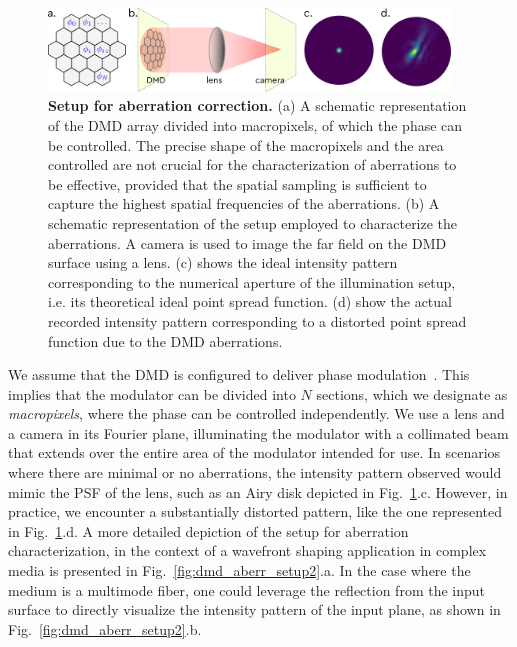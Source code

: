 \documentclass[12pt]{iopart}
\begin{document}
\begin{figure}
  \centering
  \includegraphics[width = 0.95\textwidth]{images/DMD_abberations_setup.pdf}
  \caption{
    \textbf{Setup for aberration correction.}
    (a) A schematic representation of the DMD array divided into macropixels,
    of which the phase can be controlled.
    The precise shape of the macropixels and the area controlled are not crucial for the characterization of aberrations to be effective,
    provided that the spatial sampling is sufficient to capture the highest spatial frequencies of the aberrations.
    (b) A schematic representation of the setup employed to characterize the aberrations.
    A camera is used to image the far field on the DMD surface using a lens.
    (c) shows the ideal intensity pattern corresponding to the numerical aperture of the illumination setup,
    i.e. its theoretical ideal point spread function.
    (d) show the actual recorded intensity pattern corresponding to a distorted point spread function due to the DMD aberrations.
  }
  \label{fig:dmd_aberr_setup}
\end{figure}


We assume that the DMD is configured to deliver phase modulation~\cite{lee1979binary,Gutierrez2024DMD}.
This implies that the modulator can be divided into $N$ sections,
which we designate as {\em macropixels},
where the phase can be controlled independently.
We use a lens and a camera in its Fourier plane,
illuminating the modulator with a collimated beam
that extends over the entire area of the modulator intended for use.
In scenarios where there are minimal or no aberrations,
the intensity pattern observed would mimic the PSF of the lens,
such as an Airy disk depicted in Fig.~\ref{fig:dmd_aberr_setup}.c.
However, in practice, we encounter a substantially distorted pattern,
like the one represented in Fig.~\ref{fig:dmd_aberr_setup}.d.
A more detailed depiction of the setup for aberration characterization,
in the context of a wavefront shaping application in complex media is presented in Fig.~\ref{fig:dmd_aberr_setup2}.a.
In the case where the medium is a multimode fiber,
one could leverage the reflection from the input surface
to directly visualize the intensity pattern of the input plane,
as shown in Fig.~\ref{fig:dmd_aberr_setup2}.b.\\
\end{document}
